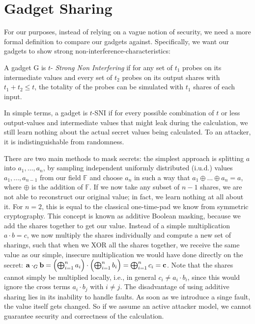 \documentclass[english, version-2020-11]{uzl-thesis}
\newcommand{\iud}[0]{i.u.d.\xspace} %
\begin{document}
  \section{Gadget Sharing}
  \label{ch:background}
   
    For our purposes, instead of relying on a vague notion of security, we need a more formal definition to compare our gadgets against. Specifically, we want our gadgets to show strong non-interference-characteristics:
    \begin{definition}[$t$-(S)NI]\cite{tSNIDef} A gadget G is $t$- \textit{Strong Non Interfering} if for any set of $t_1$ probes on its intermediate values and every set of $t_2$ probes on its output shares with $t_1+t_2 \leq t$, the totality of the probes can be simulated with $t_1$ shares of each input.


    \end{definition}
    In simple terms, a gadget is $t$-SNI if for every possible combination of $t$ or less output-values and intermediate values that might leak during the calculation, we still learn nothing about the actual secret values being calculated. To an attacker, it is indistinguishable from randomness.

    There are two main methods to mask secrets: the simplest approach is splitting $a$ into $a_1,\dots,a_n$, by sampling independent uniformly distributed (\iud) values $a_1,...,a_{n-1}$ from our field $\mathbb{F}$ and choose $a_n$ in such a way that $a_1 \oplus ... \oplus a_n=a$, where $\oplus$ is the addition of $\mathbb{F}$. If we now take any subset of $n-1$ shares, we are not able to reconstruct our original value; in fact, we learn nothing at all about it. For $n=2$, this is equal to the classical one-time-pad we know from symmetric cryptography. This concept is known as additive Boolean masking, because we add the shares together to get our value.
    Instead of a simple multiplication $a \cdot b =c$, we now multiply the shares individually and compute a new set of sharings, such that when we XOR all the shares together, we receive the
    same value as our simple, insecure multiplication we would have done directly on the secret: $\mathbf{a} \cdot_G \mathbf{b}  = \Bigl(\bigoplus_{i=1}^{n} a_i\Bigr) \cdot \Bigl(\bigoplus_{i=1}^{n} b_i\Bigr)  = \bigoplus_{i=1}^{n} c_i  = \mathbf{c}$. Note that the shares cannot simply be multiplied locally, i.e., in general $c_i \neq a_i \cdot b_i$, since this would ignore the cross terms $a_i \cdot b_j$ with $i \neq j$.
    The disadvantage of using additive sharing lies in its inability to handle faults. As soon as we introduce a singe fault, the value itself gets changed. So if we assume an active attacker model, we cannot guarantee security and correctness of the calculation.
\end{document}
